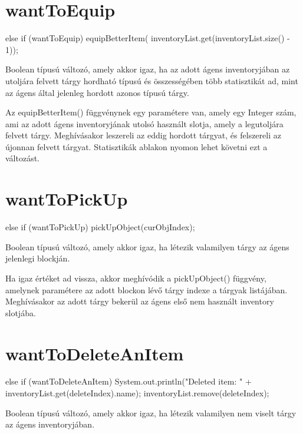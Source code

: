 \section{wantToEquip}

\begin{java}
else if (wantToEquip) {			
    equipBetterItem(
        inventoryList.get(inventoryList.size() - 1));
}
\end{java}

Boolean típusú változó, amely akkor igaz, ha az adott ágens inventoryjában az utoljára felvett tárgy hordható
típusú és összességében több statisztikát ad, mint az ágens által jelenleg hordott azonos típusú tárgy.

Az equipBetterItem() függvénynek egy paramétere van, amely egy Integer szám, ami az adott ágens inventoryjának utolsó
használt slotja, amely a legutoljára felvett tárgy. Meghívásakor leszereli az eddig hordott tárgyat, és felszereli az újonnan felvett tárgyat.
Statisztikák ablakon nyomon lehet követni ezt a változást.

\section{wantToPickUp}

\begin{java}
else if (wantToPickUp) {
    pickUpObject(curObjIndex);
}
\end{java}

Boolean típusú változó, amely akkor igaz, ha létezik valamilyen tárgy az ágens jelenlegi blockján.

Ha igaz értéket ad vissza, akkor meghívódik a pickUpObject() függvény, amelynek paramétere az adott blockon lévő tárgy
indexe a tárgyak listájában. Meghívásakor az adott tárgy bekerül az ágens első nem használt inventory slotjába.

\section{wantToDeleteAnItem}

\begin{java}
else if (wantToDeleteAnItem) {
    System.out.println("Deleted item: "
        + inventoryList.get(deleteIndex).name);
    inventoryList.remove(deleteIndex);
}
\end{java}

Boolean típusú változó, amely akkor igaz, ha létezik valamilyen nem viselt tárgy az ágens inventoryjában.

